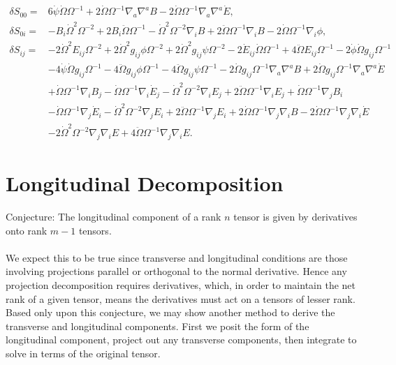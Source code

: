 \documentclass[10pt,letterpaper]{article}
\begin{document}
\begin{align}
\delta S_{00}={}&6 \dot{\psi} \dot{\Omega} \Omega^{-1}
 + 2 \dot{\Omega} \Omega^{-1} \nabla_{a}\nabla^{a}B
 - 2 \dot{\Omega} \Omega^{-1} \nabla_{a}\nabla^{a}\dot{E},
\\
\delta S_{0i}={}&- B_{i} \dot{\Omega}^2 \Omega^{-2}
 + 2 B_{i} \ddot{\Omega} \Omega^{-1}
 -  \dot{\Omega}^2 \Omega^{-2} \nabla_{i}B
 + 2 \ddot{\Omega} \Omega^{-1} \nabla_{i}B
 - 2 \dot{\Omega} \Omega^{-1} \nabla_{i}\phi,
\\
\delta S_{ij}={}&-2 \dot{\Omega}^2 E_{ij} \Omega^{-2}
 + 2 \dot{\Omega}^2 g_{ij} \phi \Omega^{-2}
 + 2 \dot{\Omega}^2 g_{ij} \psi \Omega^{-2}
 - 2 \dot{E}_{ij} \dot{\Omega} \Omega^{-1}
 + 4 \ddot{\Omega} E_{ij} \Omega^{-1}
 - 2 \dot{\phi} \dot{\Omega} g_{ij} \Omega^{-1}\nonumber\\
& - 4 \dot{\psi} \dot{\Omega} g_{ij} \Omega^{-1}
 - 4 \ddot{\Omega} g_{ij} \phi \Omega^{-1}
 - 4 \ddot{\Omega} g_{ij} \psi \Omega^{-1}
 - 2 \dot{\Omega} g_{ij} \Omega^{-1} \nabla_{a}\nabla^{a}B
 + 2 \dot{\Omega} g_{ij} \Omega^{-1} \nabla_{a}\nabla^{a}\dot{E}\nonumber\\
& + \dot{\Omega} \Omega^{-1} \nabla_{i}B_{j}
 -  \dot{\Omega} \Omega^{-1} \nabla_{i}\dot{E}_{j}
 -  \dot{\Omega}^2 \Omega^{-2} \nabla_{i}E_{j}
 + 2 \ddot{\Omega} \Omega^{-1} \nabla_{i}E_{j}
 + \dot{\Omega} \Omega^{-1} \nabla_{j}B_{i}\nonumber\\
& -  \dot{\Omega} \Omega^{-1} \nabla_{j}\dot{E}_{i}
 -  \dot{\Omega}^2 \Omega^{-2} \nabla_{j}E_{i}
 + 2 \ddot{\Omega} \Omega^{-1} \nabla_{j}E_{i}
 + 2 \dot{\Omega} \Omega^{-1} \nabla_{j}\nabla_{i}B
 - 2 \dot{\Omega} \Omega^{-1} \nabla_{j}\nabla_{i}\dot{E}\nonumber\\
& - 2 \dot{\Omega}^2 \Omega^{-2} \nabla_{j}\nabla_{i}E
 + 4 \ddot{\Omega} \Omega^{-1} \nabla_{j}\nabla_{i}E.
\end{align}

\section{Longitudinal Decomposition}
Conjecture: The longitudinal component of a rank $n$ tensor is given by derivatives onto rank $m-1$ tensors. 
\\ \\
We expect this to be true since transverse and longitudinal conditions are those involving projections parallel or orthogonal to the normal derivative. Hence any projection decomposition requires derivatives, which, in order to maintain the net rank of a given tensor, means the derivatives must act on a tensors of lesser rank. Based only upon this conjecture, we may show another method to derive the transverse and longitudinal components. First we posit the form of the longitudinal component, project out any transverse components, then integrate to solve in terms of the original tensor. 
\\ \\
\end{document}
